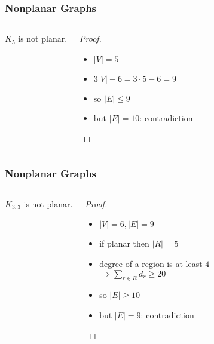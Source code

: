 \documentclass[dvipsnames]{beamer}
\begin{document}
\begin{frame}
  \frametitle{Nonplanar Graphs}

  \begin{columns}
    \begin{theorem}
      \begin{center}
      \end{center}

      $K_5$ is not planar.
    \end{theorem}

    \pause
    \begin{proof}
      \begin{itemize}
        \item $|V| = 5$

        \pause
        \item $3 |V| - 6 = 3 \cdot 5 - 6 = 9$

        \pause
        \item so $|E| \leq 9$ \\

        \pause
        \item but $|E| = 10$: \alert{contradiction}
      \end{itemize}
    \end{proof}
  \end{columns}
\end{frame}

\begin{frame}
  \frametitle{Nonplanar Graphs}

  \begin{columns}
    \begin{theorem}
      \begin{center}
      \end{center}

      $K_{3,3}$ is not planar.
    \end{theorem}

    \pause
    \begin{proof}
      \begin{itemize}
        \item $|V| = 6, |E| = 9$

        \pause
        \item if planar then $|R| = 5$

        \pause
        \item degree of a region is at least $4$\\
          $\Rightarrow \sum_{r \in R} d_r \geq 20$

        \pause
        \item so $|E| \geq 10$\\

        \pause
        \item but $|E| = 9$: \alert{contradiction}
      \end{itemize}
    \end{proof}
  \end{columns}
\end{frame}
\end{document}

